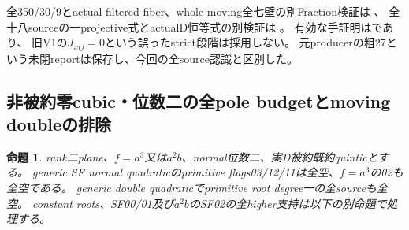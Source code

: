 \documentclass[a4paper,11pt]{ltjsarticle}
\newtheorem{proposition}{命題}[section]
\theoremstyle{definition}
\begin{document}
全350/30/9とactual filtered fiber、whole moving全七壁の別Fraction検証は
、
全十八sourceの一projective式とactualD恒等式の別検証は
。
有効な手証明はであり、
旧V1の$J_{xij}=0$という誤ったstrict段階は採用しない。
元producerの粗27という未閉reportは保存し、今回の全source認識と区別した。

\subsection{非被約零cubic・位数二の全pole budgetとmoving doubleの排除}
\begin{proposition}\label{prop:plane-nonreduced-m2-root-exclusions}
rank二plane、$f=a^3$又は$a^2b$、normal位数二、実D被約既約quinticとする。
generic SF normal quadraticのprimitive flags03/12/11は全空、$f=a^3$の02も全空である。
generic double quadraticでprimitive root degree一の全sourceも全空。
constant roots、SF00/01及び$a^2b$のSF02の全higher支持は以下の別命題で処理する。
\end{proposition}
\end{document}
